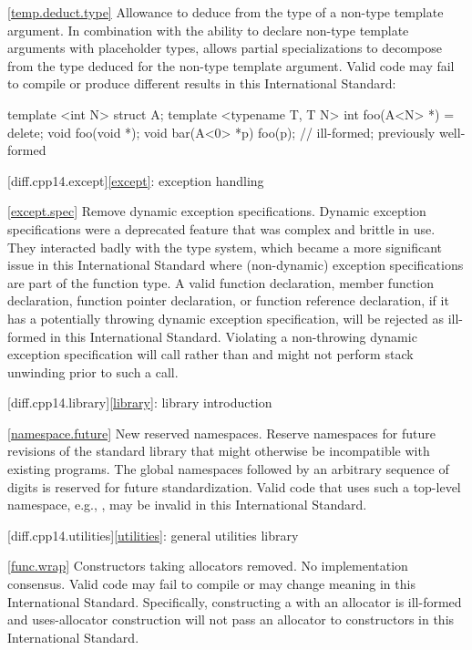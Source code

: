 \ref{temp.deduct.type}
\change Allowance to deduce from the type of a non-type template argument.
\rationale In combination with the ability to declare
non-type template arguments with placeholder types,
allows partial specializations to decompose
from the type deduced for the non-type template argument.
\effect Valid \CppXIV code may fail to compile
or produce different results in this International Standard:
\begin{codeblock}
template <int N> struct A;
template <typename T, T N> int foo(A<N> *) = delete;
void foo(void *);
void bar(A<0> *p) {
  foo(p); // ill-formed; previously well-formed
}
\end{codeblock}

[diff.cpp14.except]{\ref{except}: exception handling}

\ref{except.spec}
\change Remove dynamic exception specifications.
\rationale Dynamic exception specifications were a deprecated feature
that was complex and brittle in use.
They interacted badly with the type system,
which became a more significant issue in this International Standard
where (non-dynamic) exception specifications are part of the function type.
\effect
A valid \CppXIV function declaration,
member function declaration,
function pointer declaration,
or function reference declaration,
if it has a potentially throwing dynamic exception specification,
will be rejected as ill-formed in this International Standard.
Violating a non-throwing dynamic exception specification
will call 
rather than 
and might not perform stack unwinding prior to such a call.

[diff.cpp14.library]{\ref{library}: library introduction}

\ref{namespace.future}
\change New reserved namespaces.
\rationale Reserve namespaces for future revisions of the standard library
that might otherwise be incompatible with existing programs.
\effect
The global namespaces 
followed by an arbitrary sequence of digits
is reserved for future standardization.
Valid \CppXIV code that uses such a top-level namespace,
e.g., , may be invalid in this International Standard.

[diff.cpp14.utilities]{\ref{utilities}: general utilities library}

\ref{func.wrap}
\change Constructors taking allocators removed.
\rationale No implementation consensus.
\effect
Valid \CppXIV code may fail to compile or may change meaning in this
International Standard. Specifically, constructing a  with
an allocator is ill-formed and uses-allocator construction will not pass an
allocator to  constructors in this International Standard.

